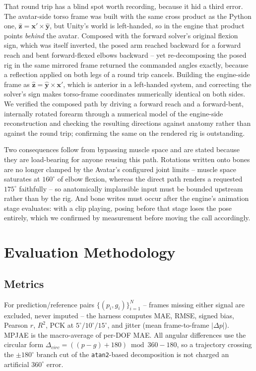 \documentclass[conference]{IEEEtran}
\begin{document}
That round trip has a blind spot worth recording, because it hid a third
error. The avatar-side torso frame was built with the same cross product
as the Python one, $\hat{\mathbf{z}}=\mathbf{x}'\times\hat{\mathbf{y}}$,
but Unity's world is left-handed, so in the engine that product points
\emph{behind} the avatar. Composed with the forward solver's original
flexion sign, which was itself inverted, the posed arm reached backward
for a forward reach and bent forward-flexed elbows backward -- yet
re-decomposing the posed rig in the same mirrored frame returned the
commanded angles exactly, because a reflection applied on both legs of a
round trip cancels. Building the engine-side frame as
$\hat{\mathbf{z}}=\hat{\mathbf{y}}\times\mathbf{x}'$, which is anterior in
a left-handed system, and correcting the solver's sign makes torso-frame
coordinates numerically identical on both sides. We verified the composed
path by driving a forward reach and a forward-bent, internally rotated
forearm through a numerical model of the engine-side reconstruction and
checking the resulting directions against anatomy rather than against the
round trip; confirming the same on the rendered rig is outstanding.

Two consequences follow from bypassing muscle space and are stated
because they are load-bearing for anyone reusing this path. Rotations
written onto bones are no longer clamped by the Avatar's configured joint
limits -- muscle space saturates at $160^\circ$ of elbow flexion, whereas
the direct path renders a requested $175^\circ$ faithfully -- so
anatomically implausible input must be bounded upstream rather than by
the rig. And bone writes must occur after the engine's animation stage
evaluates: with a clip playing, posing before that stage loses the pose
entirely, which we confirmed by measurement before moving the call
accordingly.

\section{Evaluation Methodology}
\label{sec:eval-harness}

\subsection{Metrics}
For prediction/reference pairs $\{(p_i, g_i)\}_{i=1}^{N}$ -- frames
missing either signal are excluded, never imputed -- the harness computes
MAE, RMSE, signed bias, Pearson $r$, $R^2$, PCK at
$5^\circ/10^\circ/15^\circ$, and jitter (mean frame-to-frame
$|\Delta p|$). MPJAE is the macro-average of per-DOF MAE. All angular
differences use the circular form
$\Delta_{circ} = ((p-g)+180)\bmod 360 - 180$, so a trajectory crossing
the $\pm180^\circ$ branch cut of the \texttt{atan2}-based decomposition
is not charged an artificial $360^\circ$ error.
\end{document}
